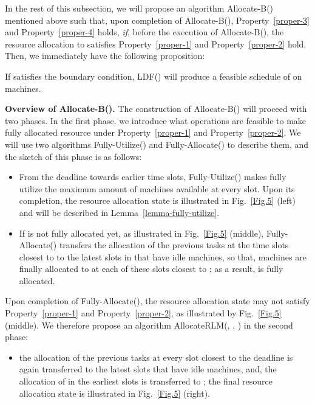 \documentclass[10pt,journal,compsoc]{IEEEtran}
\begin{document}
In the rest of this subsection, we will propose an algorithm Allocate-B() mentioned above such that, upon completion of Allocate-B(), Property~\ref{proper-3} and Property~\ref{proper-4} holds, {\em if}, before the execution of Allocate-B(), the resource allocation to  satisfies Property~\ref{proper-1} and Property~\ref{proper-2} hold. Then, we immediately have the following proposition:
\begin{proposition}\label{property-task}
If  satisfies the boundary condition, LDF() will produce a feasible schedule of  on  machines.
\end{proposition}




\vspace{0.05em}\noindent\textbf{Overview of Allocate-B().} The construction of Allocate-B() will proceed with two phases. In the first phase, we introduce what operations are feasible to make  fully allocated  resource under Property~\ref{proper-1} and Property~\ref{proper-2}. We will use two algorithms Fully-Utilize() and Fully-Allocate() to describe them, and the sketch of this phase is as follows:
\begin{itemize}
 \setlength\itemsep{0.2em}

\item From the deadline  towards earlier time slots, Fully-Utilize() makes  fully utilize the maximum amount of machines available at every slot. Upon its completion, the resource allocation state is illustrated in Fig.~\ref{Fig.5} (left) and will be described in Lemma~\ref{lemma-fully-utilize}.

\item If  is not fully allocated yet, as illustrated in Fig.~\ref{Fig.5} (middle), Fully-Allocate() transfers the allocation of the previous tasks  at the time slots closest to  to the latest slots in  that have idle machines, so that,  machines are finally allocated to  at each of these slots closest to ; as a result,  is fully allocated.


\end{itemize}
Upon completion of Fully-Allocate(), the resource allocation state may not satisfy Property~\ref{proper-1} and Property~\ref{proper-2}, as illustrated by Fig.~\ref{Fig.5} (middle). We therefore propose an algorithm AllocateRLM(, , ) in the second phase:
\begin{itemize}
\item the allocation of the previous tasks at every slot  closest to the deadline is again transferred to the latest slots that have idle machines, and, the allocation of  in the earliest slots is transferred to ; the final resource allocation state is illustrated in Fig.~\ref{Fig.5} (right).
\end{itemize}
\end{document}
